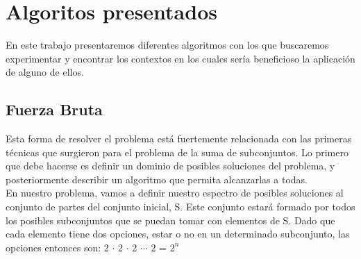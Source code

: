 \documentclass[8pt,a4paper]{article}
\begin{document}
\begin{verse}

\end{verse}
\section{Algoritos presentados}
En este trabajo presentaremos diferentes algoritmos con los que buscaremos experimentar y encontrar los contextos en los cuales sería beneficioso la aplicación de alguno de ellos.
\subsection{Fuerza Bruta}
Esta forma de resolver el problema está fuertemente relacionada con las primeras técnicas que surgieron para el problema de la suma de subconjuntos. Lo primero que debe hacerse es definir un dominio de posibles soluciones del problema, y posteriormente describir un algoritmo que permita alcanzarlas a todas. \\

	En nuestro problema, vamos a definir nuestro espectro de posibles soluciones al conjunto de partes del conjunto inicial, S. Este conjunto estará formado por todos los posibles subconjuntos que se puedan tomar con elementos de S. Dado que cada elemento tiene dos opciones, estar o no en un determinado subconjunto, las opciones entonces son: 2 $\cdot$ 2 $\cdot$ 2  $\cdots$ 2 = $2^{n}$
\end{document}
